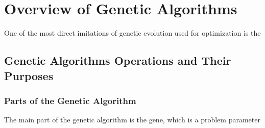 \chapter{Overview of Genetic Algorithms}
One of the most direct imitations of genetic evolution used for optimization is the 

\section{Genetic Algorithms Operations and Their Purposes}
\subsection{Parts of the Genetic Algorithm}
The main part of the genetic algorithm is the gene, which is a problem parameter 